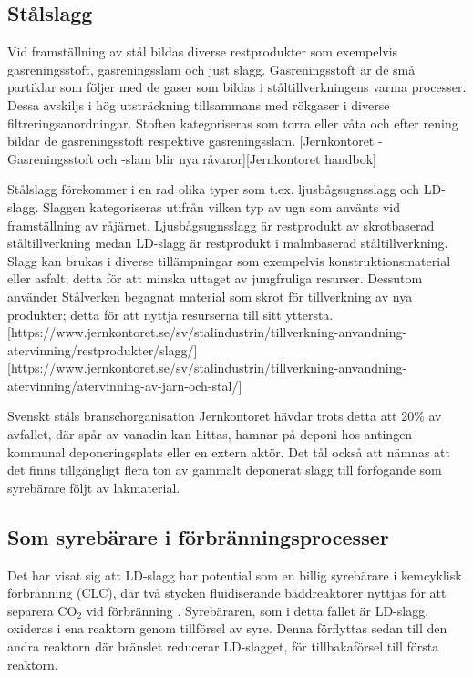 \subsection{Stålslagg} %
Vid framställning av stål bildas diverse restprodukter som exempelvis gasreningsstoft, gasreningsslam och just slagg. Gasreningsstoft är de små partiklar som följer med de gaser som bildas i ståltillverkningens varma processer. Dessa avskiljs i hög utsträckning tillsammans med rökgaser i diverse filtreringsanordningar. Stoften kategoriseras som torra eller våta och efter rening  bildar de gasreningsstoft respektive gasreningsslam. [Jernkontoret - Gasreningsstoft och -slam blir nya råvaror][Jernkontoret handbok] 

Stålslagg förekommer i en rad olika typer som t.ex. ljusbågsugnsslagg och LD-slagg\cite{Pehlke2014a}. %
Slaggen kategoriseras utifrån vilken typ av ugn som använts vid framställning av råjärnet. Ljusbågsugnsslagg är restprodukt av skrotbaserad ståltillverkning medan LD-slagg är restprodukt i malmbaserad ståltillverkning\cite{Pehlke2014a}. Slagg kan brukas i diverse tillämpningar som exempelvis konstruktionsmaterial eller asfalt; detta för att minska uttaget av jungfruliga resurser. Dessutom använder Stålverken begagnat material som skrot för tillverkning av nya produkter; detta för att nyttja resurserna till sitt yttersta. [https://www.jernkontoret.se/sv/stalindustrin/tillverkning-anvandning-atervinning/restprodukter/slagg/][https://www.jernkontoret.se/sv/stalindustrin/tillverkning-anvandning-atervinning/atervinning-av-jarn-och-stal/] 

Svenskt ståls branschorganisation Jernkontoret hävdar trots detta att 20\% av avfallet, där spår av vanadin kan hittas, hamnar på deponi hos antingen kommunal deponeringsplats eller en extern aktör\cite{PontusWestrin}. Det tål också att nämnas att det finns tillgängligt flera ton av gammalt deponerat slagg till förfogande som syrebärare följt av lakmaterial. %


\subsection{Som syrebärare i förbränningsprocesser}
Det har visat sig att LD-slagg har potential som en billig syrebärare i kemcyklisk förbränning (CLC), där två stycken fluidiserande bäddreaktorer nyttjas för att separera CO$_2$ vid förbränning \cite{Xu2017}. Syrebäraren, som i detta fallet är LD-slagg, oxideras i ena reaktorn genom tillförsel av syre. Denna förflyttas sedan till den andra reaktorn där bränslet reducerar LD-slagget, för tillbakaförsel till första reaktorn.  %
 
